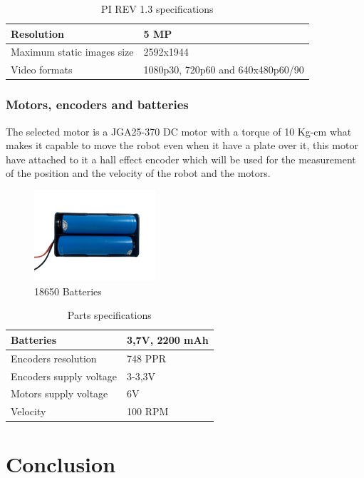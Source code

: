\begin{table}[H]
\caption{PI REV 1.3 specifications}
\begin{centering}
\begin{tabular}{>{\centering}p{7cm}>{\centering}p{4cm}}
\hline 
\raggedright{}Resolution & \raggedright{}5 MP\tabularnewline
\hline 
\raggedright{}Maximum static images size & \raggedright{}2592x1944\tabularnewline
\hline 
\raggedright{}Video formats & \raggedright{}1080p30, 720p60 and 640x480p60/90\tabularnewline
\hline 
\end{tabular}
\par\end{centering}
\end{table}

\subsection{Motors, encoders and batteries}

The selected motor is a JGA25-370 DC motor with a torque of 10 Kg-cm what makes it capable to move the robot even when it have a plate over it, this motor have attached to it a hall effect encoder which will be used for the measurement of the position and the velocity of the robot and the motors.  

\begin{figure}[H]
    \centering
 	\includegraphics[trim=0 0 0 0,clip,width=0.4\textwidth]{Figs/Batteries1.png}
    \caption{18650 Batteries}
    \label{fig:Batteries}
\end{figure}

\begin{table}[H]
\caption{Parts specifications}
\begin{centering}
\begin{tabular}{>{\centering}p{7cm}>{\centering}p{4cm}}
\hline 
\raggedright{}Batteries & \raggedright{}3,7V, 2200 mAh\tabularnewline
\hline 
\raggedright{}Encoders resolution& \raggedright{}748 PPR\tabularnewline
\hline 
\raggedright{}Encoders supply voltage & \raggedright{}3-3,3V\tabularnewline
\hline 
\raggedright{}Motors supply voltage & \raggedright{}6V\tabularnewline
\hline 
\raggedright{}Velocity & \raggedright{}100 RPM\tabularnewline
\hline 
\end{tabular}
\par\end{centering}
\end{table}

\newpage

\cleardoublepage
\chapter{Conclusion}





